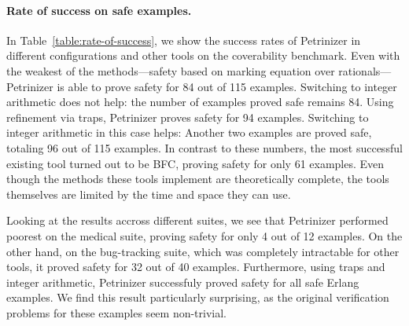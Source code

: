 \paragraph{Rate of success on safe examples.}
In Table~\ref{table:rate-of-success}, we show the success rates
of Petrinizer in different configurations and other tools
on the coverability benchmark.
Even with the weakest of the
methods—safety based on marking equation over rationals—Petrinizer is
able to prove safety for 84 out
of 115 examples. Switching to integer arithmetic does not help: the number of
examples proved safe remains 84. 
Using refinement via traps, Petrinizer proves
safety for 94 examples. Switching to integer arithmetic in this case helps:
Another two examples are proved safe, totaling 96 out of 115 examples. 
In contrast to these numbers, the most successful existing tool turned out to be BFC, proving safety for
only 61 examples. 
Even though the methods these tools implement
are theoretically complete, the tools themselves are limited by the time and space they can
use.

Looking at the results accross different suites, we see that Petrinizer
performed poorest on the medical suite, proving safety for only 4 out of 12
examples. On the other hand, on the bug-tracking suite, which was completely
intractable for other tools, it proved safety for 32 out of 40 examples.
Furthermore, using traps and integer arithmetic, Petrinizer successfuly proved
safety for all safe Erlang examples. We find this result particularly
surprising, as the original verification problems for these examples seem non-trivial.

